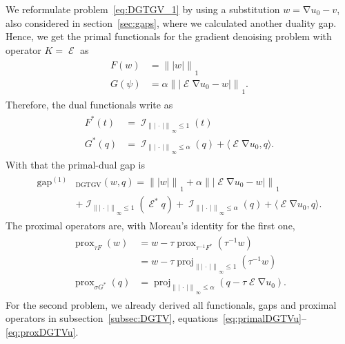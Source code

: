 \documentclass[twocolumn,envcountsame]{svjour3}
\newcommand{\norm}[2][]{{\|{#2}\|_{}}_{#1}}
\newcommand{\abs}[1]{|#1|}
\newcommand{\scp}[2]{\langle #1,#2\rangle}
\newcommand{\dummy}{\,\cdot\,}
\DeclareMathOperator{\ind}{\mathcal{I}}
\DeclareMathOperator{\prox}{prox}
\DeclareMathOperator{\proj}{proj}
\DeclareMathOperator{\gap}{gap}
\DeclareMathOperator{\grad}{\nabla}
\DeclareMathOperator{\symgrad}{\mathcal{E}}
\DeclareMathOperator{\DGTGV}{DGTGV}
\begin{document}
We reformulate problem~\eqref{eq:DGTGV_1} by using a substitution 
$w = \grad u_0 - v$, also considered in section~\ref{sec:gaps}, 
where we calculated another duality gap.
Hence, we get the primal functionals for the gradient denoising 
problem with operator $K = \symgrad$ as
\begin{align}\label{eq:primalDGTGVw}
\begin{split}
	F(w) 	&= \norm[1]{\abs{w}}\\
	G(\psi) &= \alpha\norm[1]{\abs{\symgrad \grad u_0 - w}}.
\end{split}
\end{align}
Therefore, the dual functionals write as
\begin{align}\label{eq:dualDGTGVw}
\begin{split}
	F^*(t) 	&= \ind_{\norm[\infty]{\abs{\dummy}}\leq 1}(t)\\
	G^*(q) 	&= \ind_{\norm[\infty]{\abs{\dummy}}\leq \alpha}(q)
				+ \scp{\symgrad\grad u_0}{q}.
\end{split}
\end{align}
With that the primal-dual gap is
\begin{align}\label{eq:gapDGTGVw}
\begin{split}
	\gap^{(1)}&_{\DGTGV}(w,q) = 
	 \norm[1]{\abs{w}} 
		+ \alpha \norm[1]{\abs{\symgrad \grad u_0 - w}} \\
		&+ \ind_{\norm[\infty]{\abs{\dummy}}\leq 1}(\symgrad^*q)
		+ \ind_{\norm[\infty]{\abs{\dummy}}\leq \alpha}(q)
		+ \scp{\symgrad\grad u_0}{q}.
\end{split}
\end{align}
The proximal operators are, with Moreau's identity for the first 
one, 
\begin{align}
\begin{split}
	\prox_{\tau  F}(w)
	&= w - \tau\prox_{\tau^{-1} F^{*}}(\tau^{-1}w)\\
	&= w - \tau\proj_{\norm[\infty]{\abs{\dummy}}\leq 1}
		(\tau^{-1}w)\\
	\prox_{\sigma G^*}(q)
	&= \proj_{\norm[\infty]{\abs{\dummy}}\leq \alpha}
		(q - \tau\symgrad\grad u_0).
\end{split}
\end{align}
For the second problem, we already derived all functionals, gaps and proximal operators in subsection~\ref{subsec:DGTV}, 
equations~\eqref{eq:primalDGTVu}--\eqref{eq:proxDGTVu}.
\end{document}
